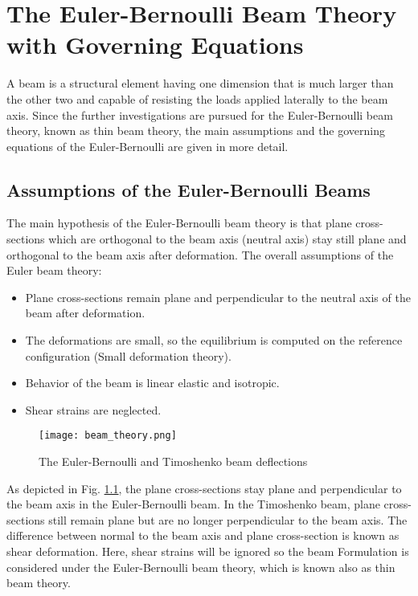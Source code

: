 \chapter{The Euler-Bernoulli Beam Theory with Governing Equations}
\label{sec:second}

A beam is a structural element having one dimension that is much larger than the other two and capable 
of resisting the loads applied laterally to the beam axis. Since the further investigations are pursued
for the Euler-Bernoulli beam theory, known as thin beam theory, the main assumptions and the governing 
equations of the Euler-Bernoulli are given in more detail.

\section{Assumptions of the Euler-Bernoulli Beams}

The main hypothesis of the Euler-Bernoulli beam theory is that plane cross-sections which are orthogonal 
to the beam axis (neutral axis) stay still plane and orthogonal to the beam axis after deformation. 
The overall assumptions of the Euler beam theory: %

\begin{itemize}
    \item Plane cross-sections remain plane and perpendicular to the neutral axis of the beam after deformation.
    \item The deformations are small, so the equilibrium is computed on the reference configuration (Small deformation theory).
    \item Behavior of the beam is linear elastic and isotropic.
    \item Shear strains are neglected.
\end{itemize}


\begin{figure}[!ht]
    \centering
    \texttt{[image: beam\_theory.png]}  
    \caption{The Euler-Bernoulli and Timoshenko beam deflections}
    \label{fig:euler_theory}
\end{figure}

As depicted in Fig. \ref{fig:euler_theory}, the plane cross-sections stay plane and perpendicular to the 
beam axis in the Euler-Bernoulli beam. In the Timoshenko beam, plane cross-sections still remain plane but
are no longer perpendicular to the beam axis. The difference between normal to the beam axis and plane
cross-section is known as shear deformation. Here, shear strains will be ignored so the beam Formulation
is considered under the Euler-Bernoulli beam theory, which is known also as thin beam theory.

